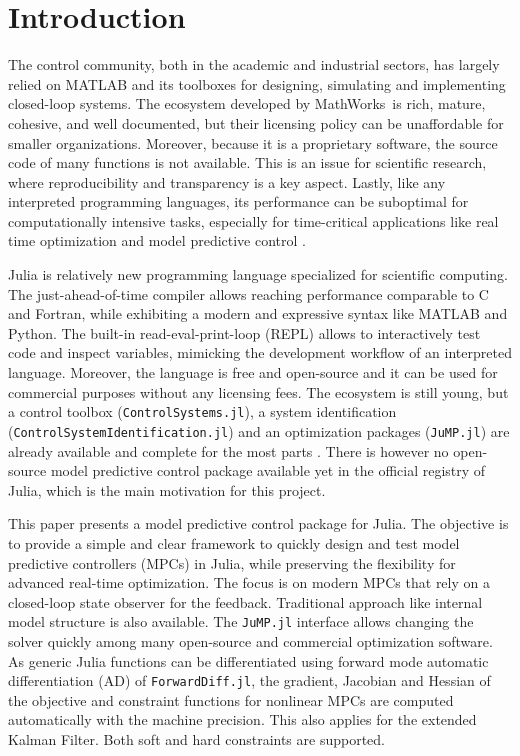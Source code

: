 \section{Introduction}

The control community, both in the academic and industrial sectors, has largely relied on MATLAB and its toolboxes for designing, simulating and implementing closed-loop systems. The ecosystem developed by MathWorks\texttrademark\ is rich, mature, cohesive, and well documented, but their licensing policy can be unaffordable for smaller organizations. Moreover, because it is a proprietary software, the source code of many functions is not available. This is an issue for scientific research, where reproducibility and transparency is a key aspect. Lastly, like any interpreted programming languages, its performance can be suboptimal for computationally intensive tasks, especially for time-critical applications like real time optimization and model predictive control \citep{matlabPythonJulia}.

Julia is relatively new programming language specialized for scientific computing. The just-ahead-of-time compiler allows reaching performance comparable to C and Fortran, while exhibiting a modern and expressive syntax like MATLAB and Python. The built-in read-eval-print-loop (REPL) allows to interactively test code and inspect variables, mimicking the development workflow of an interpreted language. Moreover, the language is free and open-source and it can be used for commercial purposes without any licensing fees. The ecosystem is still young, but a control toolbox (\texttt{ControlSystems.jl}), a system identification (\texttt{ControlSystemIdentification.jl}) and an optimization packages (\texttt{JuMP.jl}) are already available and complete for the most parts \citep{controlsystems_jl, jump_jl}. There is however no open-source model predictive control package available yet in the official registry of Julia, which is the main motivation for this project.

This paper presents a model predictive control package for Julia. The objective is to provide a simple and clear framework to quickly design and test model predictive controllers (MPCs) in Julia, while preserving the flexibility for advanced real-time optimization. The focus is on modern MPCs that rely on a closed-loop state observer for the feedback. Traditional approach like internal model structure is also available. The \texttt{JuMP.jl} interface allows changing the solver quickly among  many open-source and commercial optimization software. As generic Julia functions can be differentiated using forward mode automatic differentiation (AD) of \texttt{ForwardDiff.jl}, the gradient, Jacobian and Hessian of the objective and constraint functions for nonlinear MPCs are computed automatically with the machine precision. This also applies for the extended Kalman Filter. Both soft and hard constraints are supported. 

